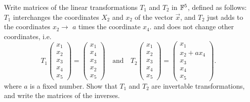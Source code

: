 \begin{exercise}
  Write matrices of the linear transformations $T_1$ and $T_2$ in $\mathbb{F}^5$,
  defined as follows: $T_1$ interchanges the coordinates $X_2$ and $x_2$
  of the vector $\vec{x}$, and $T_2$ just adds to the coordinates 
  $x_2\to$
  $a$ times the coordinate $x_4$. and does not change other coordinates, i.e.
  \[
    T_1
    \begin{pmatrix}
      x_1\\x_2\\x_3\\x_4\\x_5
    \end{pmatrix}=
    \begin{pmatrix}
      x_1\\x_4\\x_3\\x_2\\x_5
    \end{pmatrix}
    \quad\text{and}\quad
    T_2
    \begin{pmatrix}
      x_1\\x_2\\x_3\\x_4\\x_5
    \end{pmatrix}=
    \begin{pmatrix}
      x_1\\x_2+ax_4\\x_3\\x_4\\x_5
    \end{pmatrix}.
  \]
  where $a$ is a fixed number.
  Show that $T_1$ and $T_2$ are invertable transformations, and write
  the matrices of the inverses.
\end{exercise}











